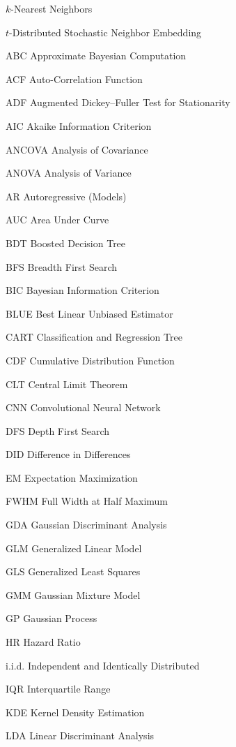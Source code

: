\begin{symbollist}
  \item[\kNN] $k$-Nearest Neighbors
  \item[\tSNE] $t$-Distributed Stochastic Neighbor Embedding
  \item[ABC] Approximate Bayesian Computation
  \item[ACF] Auto-Correlation Function
  \item[ADF] Augmented Dickey--Fuller Test for Stationarity
  \item[AIC] Akaike Information Criterion
  \item[ANCOVA] Analysis of Covariance
  \item[ANOVA] Analysis of Variance
  \item[AR] Autoregressive (Models)
  \item[AUC] Area Under Curve
  \item[BDT] Boosted Decision Tree
  \item[BFS] Breadth First Search
  \item[BIC] Bayesian Information Criterion
  \item[BLUE] Best Linear Unbiased Estimator
  \item[CART] Classification and Regression Tree
  \item[CDF] Cumulative Distribution Function
  \item[CLT] Central Limit Theorem
  \item[CNN] Convolutional Neural Network
  \item[DFS] Depth First Search
  \item[DID] Difference in Differences
  \item[EM] Expectation Maximization
  \item[FWHM] Full Width at Half Maximum
  \item[GDA] Gaussian Discriminant Analysis
  \item[GLM] Generalized Linear Model
  \item[GLS] Generalized Least Squares
  \item[GMM] Gaussian Mixture Model
  \item[GP] Gaussian Process
  \item[HR] Hazard Ratio
  \item[i.i.d.] Independent and Identically Distributed
  \item[IQR] Interquartile Range
  \item[KDE] Kernel Density Estimation
  \item[LDA] Linear Discriminant Analysis

\end{symbollist}
